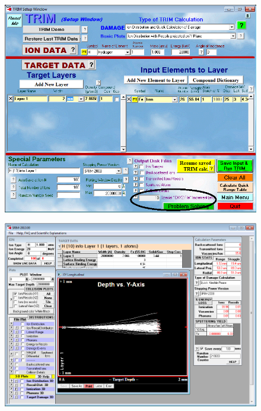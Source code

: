 \documentclass[12pt,twoside]{manual}
\begin{document}
\begin{figure}[h]
  \begin{center}
    \includegraphics[scale=0.50]{img/srim1}
  \end{center}
\end{figure}

\begin{figure}[h]
  \begin{center}
    \includegraphics[scale=0.40]{img/srim2}
  \end{center}
\end{figure}
\end{document}
